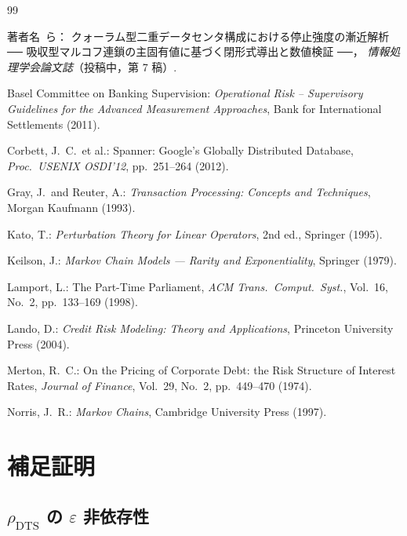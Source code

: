 \documentclass[12pt,a4paper]{article}
\theoremstyle{plain}
\theoremstyle{definition}
\theoremstyle{remark}
\newcommand{\eps}{\varepsilon}         %
\newcommand{\rhoDTS}{\rho_{\mathrm{DTS}}}
\begin{document}
\begin{thebibliography}{99}

  著者名~ら：
  クォーラム型二重データセンタ構成における停止強度の漸近解析
  ── 吸収型マルコフ連鎖の主固有値に基づく閉形式導出と数値検証 ──，
  \textit{情報処理学会論文誌}（投稿中，第 7 稿）.

  Basel Committee on Banking Supervision:
  \textit{Operational Risk -- Supervisory Guidelines for
  the Advanced Measurement Approaches},
  Bank for International Settlements (2011).

  Corbett, J.~C.\ et al.:
  Spanner: Google's Globally Distributed Database,
  \textit{Proc.\ USENIX OSDI'12}, pp.~251--264 (2012).

  Gray, J.\ and Reuter, A.:
  \textit{Transaction Processing: Concepts and Techniques},
  Morgan Kaufmann (1993).

  Kato, T.:
  \textit{Perturbation Theory for Linear Operators},
  2nd ed., Springer (1995).

  Keilson, J.:
  \textit{Markov Chain Models --- Rarity and Exponentiality},
  Springer (1979).

  Lamport, L.:
  The Part-Time Parliament,
  \textit{ACM Trans.\ Comput.\ Syst.}, Vol.~16, No.~2, pp.~133--169 (1998).

  Lando, D.:
  \textit{Credit Risk Modeling: Theory and Applications},
  Princeton University Press (2004).

  Merton, R.~C.:
  On the Pricing of Corporate Debt: the Risk Structure of Interest Rates,
  \textit{Journal of Finance}, Vol.~29, No.~2, pp.~449--470 (1974).

  Norris, J.~R.:
  \textit{Markov Chains},
  Cambridge University Press (1997).

\end{thebibliography}

\appendix

\section{補足証明}\label{app:proofs}

\subsection{$\rhoDTS$ の $\eps$ 非依存性}\label{app:rho_const}
\end{document}
